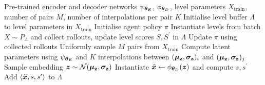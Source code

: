 \documentclass{article}
\theoremstyle{plain}
\theoremstyle{definition}
\theoremstyle{remark}
\newcommand{\Input}{\Require}
\begin{document}
\begin{algorithm}[!htb]
\centering
\caption{Data-regularised environment design}\label{alg:DRED}
\begin{algorithmic}[1]
\Input Pre-trained encoder and decoder networks $\psi_{{\bm{\theta}}_E}$, $\phi_{{\bm{\theta}}_D}$, level parameters $X_\text{train}$, number of pairs $M$, number of interpolations per pair $K$
\State Initialise level buffer $\Lambda$ to level parameters in $X_\text{train}$ 
\State Initialise agent policy $\pi$
    \State Instantiate levels from batch $X \sim P_\Lambda$ and collect rollouts, update level scores $S, S^\prime$ in $\Lambda$
    \State Update $\pi$ using collected rollouts
    \State Uniformly sample $M$ pairs from $X_\text{train}$
        \State Compute latent parameters using $\psi_{{\bm{\theta}}_E}$ and $K$ interpolations between $({\bm{\mu}}_{\mathbf{z}}, {\bm{\sigma}}_{\mathbf{z}})_{i}$ and $({\bm{\mu}}_{\mathbf{z}}, {\bm{\sigma}}_{\mathbf{z}})_{j}$
            \State Sample embedding ${\bm{z}} \sim \mathcal{N}({\bm{\mu}}_{\mathbf{z}}, {\bm{\sigma}}_{\mathbf{z}})$
            \State Instantiate $\tilde{{\bm{x}}} \gets \phi_{{\bm{\theta}}_D}({\bm{z}})$ and compute $s, s^\prime$
            \State Add $\langle \tilde{{\bm{x}}}, s, s^\prime \rangle$ to $\Lambda$ %
        \EndFor
    \EndFor
\EndWhile
\end{algorithmic}
\end{algorithm}
%
\end{document}
